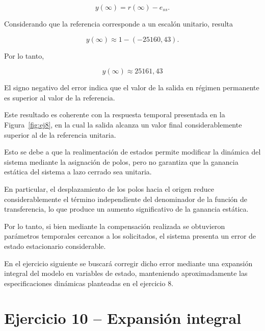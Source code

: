\documentclass[10pt]{article}
\begin{document}
\begin{equation}
    y(\infty)=r(\infty)-e_{ss}.
\end{equation}

Considerando que la referencia corresponde a un
escalón unitario, resulta

\begin{equation}
    y(\infty)\approx1-(-25160{,}43).
\end{equation}

Por lo tanto,

\begin{equation}
    \boxed{
        y(\infty)\approx25161{,}43
    }
    \label{eq:ej9_valor_final}
\end{equation}

El signo negativo del error indica que el valor
de la salida en régimen permanente es superior
al valor de la referencia.

Este resultado es coherente con la respuesta temporal
presentada en la Figura~\ref{fig:ej8}, en la cual
la salida alcanza un valor final considerablemente
superior al de la referencia unitaria.

Esto se debe a que la realimentación de estados permite
modificar la dinámica del sistema mediante la asignación
de polos, pero no garantiza que la ganancia estática
del sistema a lazo cerrado sea unitaria.

En particular, el desplazamiento de los polos hacia
el origen reduce considerablemente el término independiente
del denominador de la función de transferencia, lo que
produce un aumento significativo de la ganancia estática.

Por lo tanto, si bien mediante la compensación realizada
se obtuvieron parámetros temporales cercanos a los
solicitados, el sistema presenta un error de estado
estacionario considerable.

En el ejercicio siguiente se buscará corregir dicho
error mediante una expansión integral del modelo
en variables de estado, manteniendo aproximadamente
las especificaciones dinámicas planteadas en el
ejercicio 8.




\clearpage
\setcounter{section}{10}
\setcounter{subsection}{0}
\section*{Ejercicio 10 -- Expansión integral}
\end{document}
